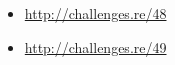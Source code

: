 \subsection{\Exercises}

\begin{itemize}
	\item \url{http://challenges.re/48}
	\item \url{http://challenges.re/49}
\end{itemize}

